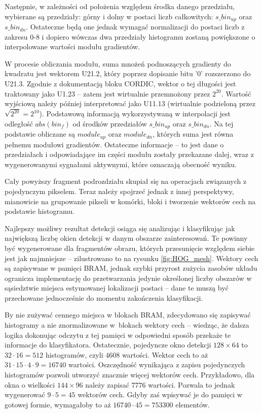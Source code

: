 Następnie, w zależności od położenia względem środka danego przedziału, wybierane są przedziały: górny i dolny w postaci liczb całkowitych: $s\_bin_{up}$ oraz $s\_bin_{dn}$. 
Ostateczne będą one jednak wymagać normalizacji do postaci liczb z zakresu 0-8 i dopiero wówczas
dwa przedziały histogramu zostaną powiększone o interpolowane wartości modułu gradientów. 

W procesie obliczania modułu, suma mnożeń podnoszących gradienty do kwadratu jest wektorem U21.2, który poprzez dopisanie bitu '0' rozszerzono do U21.3. 
Zgodnie z dokumentacją bloku CORDIC, wektor o tej długości jest traktowany jako U1.23 -- zatem jest wirtualnie przemnożony przez $2^{20}$. 
Wartość wyjściową należy później interpretować jako U11.13 (wirtualnie podzieloną przez $\sqrt{2^{20}}=2^{10}$). 
Podstawową informacją wykorzystywaną w interpolacji jest odległość $abs(bin_f)$ od środków przedziałów $s\_bin_{up}$ oraz $s\_bin_{dn}$. 
Na tej podstawie obliczane są $module_{up}$ oraz $module_{dn}$, których suma jest równa pełnemu modułowi gradientów.
Ostateczne informacje -- to jest dane o przedziałach i odpowiadające im części modułu zostały przekazane dalej, wraz z wygenerowanymi sygnałami aktywnymi, które oznaczają obecność wyniku. 

Cały powyższy fragment podrozdziału skupiał się na operacjach związanych z pojedynczym pikselem. 
Teraz należy spojrzeć jednak z innej perspektywy, mianowicie na grupowanie pikseli w komórki, bloki i tworzenie wektorów cech na podstawie histogramu. 

Najlepszy możliwy rezultat detekcji osiąga się analizując i klasyfikując jak największą liczbę okien detekcji w danym obszarze zainteresowań. %
Te powinny być wygenerowane dla fragmentów obrazu, których przesunięcie względem siebie jest jak najmniejsze -- zilustrowano to na rysunku \ref{fig:HOG_mesh}. 
Wektory cech są zapisywane w pamięci BRAM, jednak szybki przyrost zużycia zasobów układu ogranicza implementację do przetwarzania jedynie określonej liczby obszarów w sąsiedztwie miejsca estymowanej lokalizacji postaci -- dane te muszą być przechowane jednocześnie do momentu zakończenia klasyfikacji.

By nie zużywać cennego miejsca w blokach BRAM, zdecydowano się zapisywać histogramy a nie znormalizowane w~blokach wektory cech -- wiedząc, że dalsza logika dokonując odczytu z tej pamięci w odpowiedni sposób przekaże te informacje do klasyfikatora. 
Ostatecznie, pojedyncze okno detekcji $128\times 64$ to $32\cdot16=512$ histogramów, czyli $4608$ wartości. 
Wektor cech to aż $31\cdot15\cdot4\cdot9=16740$ wartości. 
Oszczędność wynikająca z zapisu pojedynczych histogramów pozwoli utworzyć znacznie więcej wektorów cech. 
Przykładowo, dla okna o wielkości $144\times 96$ należy zapisać $7776$ wartości. 
Pozwala to jednak wygenerować $9\cdot5=45$ wektorów cech. 
Gdyby zaś wpisywać je do pamięci w gotowej formie, wymagałoby to aż $16740\cdot45=753300$ elementów. 

